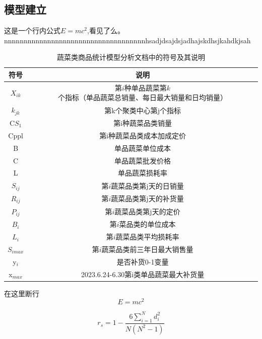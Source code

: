 \documentclass[withoutpreface]{njtechmcmthesis}
\begin{document}
\subsection{模型建立}
这是一个行内公式$E = mc^2$,看见了么。nnnnnnnnnnnnnnnnnnnnnnnnnnnnnnnnnnnnhsadjdsajdsjadhajskdhsjkahdkjsah
\begin{table}
\centering
\begin{tabular}{cc}
\hline
\textbf{符号} & \textbf{说明} \\ 
\hline
$X_{ik}$ & 第$i$种单品蔬菜第$k$个指标（单品蔬菜总销量、每日最大销量和日均销量）\\ 

$k_{jk}$ & 第k个聚类中心第j个指标\\ 

C$S_{1}$ & 第i种蔬菜品类销量\\ 

Cppl & 第i种蔬菜品类成本加成定价 \\ 

B & 单品蔬菜单位成本 \\ 

C & 单品蔬菜批发价格 \\ 

L & 单品蔬菜损耗率 \\ 

$S_{ij}$ & 第$i$蔬菜品类第j天的日销量 \\ 

$R_{ij}$ & 第$i$蔬菜品类第j天的补货量 \\ 

$P_{ij}$ & 第$i$蔬菜品类第j天的定价\\ 

$B_{i}$ & 第$i$菜品类的单位成本 \\ 

$L_{i}$ & 第$i$蔬菜品类平均损耗率 \\ 

$S_{imax}$ & 第$i$蔬菜品类前三年日最大销售量 \\ 

y$_{i}$ & 是否补货0-1变量\\ 

x$_{max}$ & 2023.6.24-6.30第i类单品蔬菜最大补货量 \\ 
\hline
\end{tabular}
\caption{蔬菜类商品统计模型分析文档中的符号及其说明}
\label{tab:symbols_description}
\end{table}

在这里断行
$$
E = mc^2
$$


\begin{equation}
   r_{s}=1-\frac{6\sum _{i=1}^Nd_i^2}{N(N^2-1)}  
\end{equation}
\end{document}
